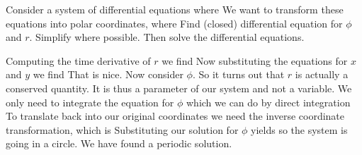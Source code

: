 Consider a system of differential equations where 
We want to transform these equations into polar coordinates, where 
Find (closed) differential equation for $\phi$ and $r$. Simplify where possible. Then solve the differential equations. 

\solution
Computing the time derivative of $r$ we find 
Now substituting the equations for $x$ and $y$ we find 
That is nice. Now consider $\phi$.
So it turns out that $r$ is actually a conserved quantity. It is thus a parameter of our system and not a variable. We only need to integrate the equation for $\phi$ which we can do by direct integration 
To translate back into our original coordinates we need the inverse coordinate transformation, which is 
Substituting our solution for $\phi$ yields
so the system is going in a circle. We have found a periodic solution. 
